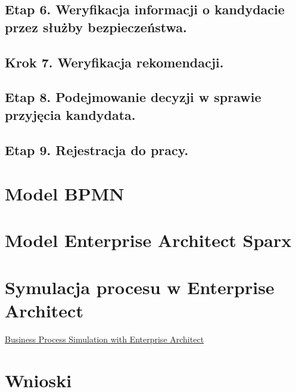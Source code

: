 \documentclass[a4paper, 12pt]{article}
\begin{document}
\subsection{Etap 6. Weryfikacja informacji o kandydacie przez służby bezpieczeństwa.}
\subsection{Krok 7. Weryfikacja rekomendacji.}
\subsection{Etap 8. Podejmowanie decyzji w sprawie przyjęcia kandydata.}
\subsection{Etap 9. Rejestracja do pracy.}

\section{Model BPMN}
\section{Model Enterprise Architect Sparx}
\section{Symulacja procesu w Enterprise Architect}
				\href{https://www.youtube.com/watch?v=f0izAg3FUcM&app=desktop} {Business Process Simulation with Enterprise Architect} \newline
\section{Wnioski} 


\label{LastPage}~
\label{LastPageOfBackMatter}~		
\end{document}
